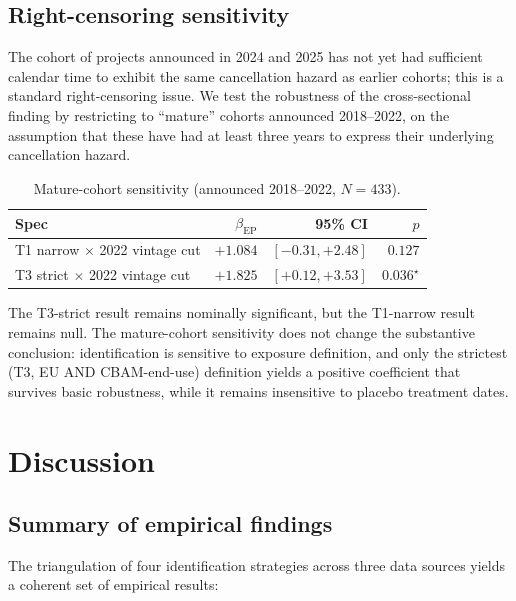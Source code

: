 \documentclass[11pt,a4paper]{article}
\newcommand{\bep}{\beta_{\mathrm{EP}}}
\begin{document}
\subsection{Right-censoring sensitivity}

The cohort of projects announced in 2024 and 2025 has not yet had sufficient calendar time to exhibit the same cancellation hazard as earlier cohorts; this is a standard right-censoring issue. We test the robustness of the cross-sectional finding by restricting to ``mature'' cohorts announced 2018--2022, on the assumption that these have had at least three years to express their underlying cancellation hazard.

\begin{table}[ht]
\centering
\caption{Mature-cohort sensitivity (announced 2018--2022, $N=433$).}
\label{tab:ch8-mature}
\begin{tabular}{lrrr}
\toprule
Spec & $\bep$ & 95\% CI & $p$ \\
\midrule
T1 narrow $\times$ 2022 vintage cut & $+1.084$ & $[-0.31, +2.48]$ & $0.127$ \\
T3 strict $\times$ 2022 vintage cut & $+1.825$ & $[+0.12, +3.53]$ & $0.036^{\star}$ \\
\bottomrule
\end{tabular}
\end{table}

The T3-strict result remains nominally significant, but the T1-narrow result remains null. The mature-cohort sensitivity does not change the substantive conclusion: identification is sensitive to exposure definition, and only the strictest (T3, EU AND CBAM-end-use) definition yields a positive coefficient that survives basic robustness, while it remains insensitive to placebo treatment dates.

\section{Discussion}
\label{sec:ch8-discussion}

\subsection{Summary of empirical findings}

The triangulation of four identification strategies across three data sources yields a coherent set of empirical results:
\end{document}
